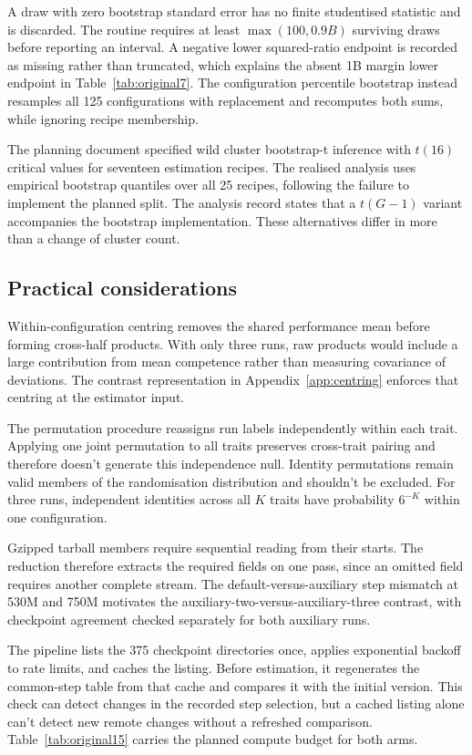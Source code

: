 A draw with zero bootstrap standard error has no finite studentised statistic and is discarded. The routine requires at least $\max(100,0.9B)$ surviving draws before reporting an interval. A negative lower squared-ratio endpoint is recorded as missing rather than truncated, which explains the absent 1B margin lower endpoint in Table~\ref{tab:original7}. The configuration percentile bootstrap instead resamples all 125 configurations with replacement and recomputes both sums, while ignoring recipe membership.

The planning document specified wild cluster bootstrap-t inference with $t(16)$ critical values for seventeen estimation recipes. The realised analysis uses empirical bootstrap quantiles over all 25 recipes, following the failure to implement the planned split. The analysis record states that a $t(G-1)$ variant accompanies the bootstrap implementation. These alternatives differ in more than a change of cluster count.

\subsection{Practical considerations}
Within-configuration centring removes the shared performance mean before forming cross-half products. With only three runs, raw products would include a large contribution from mean competence rather than measuring covariance of deviations. The contrast representation in Appendix~\ref{app:centring} enforces that centring at the estimator input.

The permutation procedure reassigns run labels independently within each trait. Applying one joint permutation to all traits preserves cross-trait pairing and therefore doesn't generate this independence null. Identity permutations remain valid members of the randomisation distribution and shouldn't be excluded. For three runs, independent identities across all $K$ traits have probability $6^{-K}$ within one configuration.

Gzipped tarball members require sequential reading from their starts. The reduction therefore extracts the required fields on one pass, since an omitted field requires another complete stream. The default-versus-auxiliary step mismatch at 530M and 750M motivates the auxiliary-two-versus-auxiliary-three contrast, with checkpoint agreement checked separately for both auxiliary runs.

The pipeline lists the 375 checkpoint directories once, applies exponential backoff to rate limits, and caches the listing. Before estimation, it regenerates the common-step table from that cache and compares it with the initial version. This check can detect changes in the recorded step selection, but a cached listing alone can't detect new remote changes without a refreshed comparison. Table~\ref{tab:original15} carries the planned compute budget for both arms.


